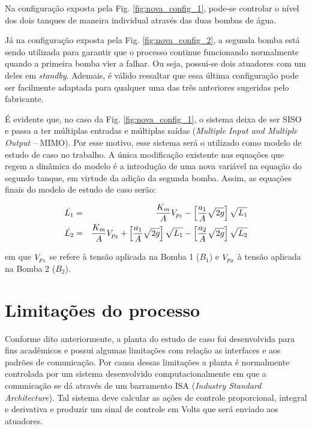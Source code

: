 Na configuração exposta pela Fig. \ref{fig:nova_config_1}, pode-se controlar o
nível dos dois tanques de maneira individual através das duas bombas de água.

Já na configuração exposta pela Fig. \ref{fig:nova_config_2}, a segunda bomba
está sendo utilizada para garantir que o processo continue funcionando
normalmente quando a primeira bomba vier a falhar. Ou seja, possui-se dois
atuadores com um deles em {\it standby}. Ademais, é válido ressaltar que essa
última configuração pode ser facilmente adaptada para qualquer uma das três
anteriores sugeridas pelo fabricante.

É evidente que, no caso da Fig. \ref{fig:nova_config_1}, o sistema deixa de ser
SISO e passa a ter múltiplas entradas e múltiplas saídas ({\it Multiple Input
and Multiple Output} -- MIMO). Por esse motivo, esse sistema será o utilizado
como modelo de estudo de caso no trabalho. A única modificação existente nas
equações que regem a dinâmica do modelo é a introdução de uma nova variável na
equação do segundo tanque, em virtude da adição da segunda bomba. Assim, as
equações finais do modelo de estudo de caso serão:

\begin{eqnarray}
\dot{L_1} & = & \frac{K_m}{A}V_{p_{\tiny 1}} -
                \left[\frac{a_1}{A}\sqrt{2g}\right]\sqrt{L_1}
                \label{eq:l1_ponto}\\
\dot{L_2} & = & \frac{K_m}{A}V_{p_{\tiny 2}} +
                \left[\frac{a_1}{A}\sqrt{2g}\right]\sqrt{L_1} -
                \left[\frac{a_2}{A}\sqrt{2g}\right]\sqrt{L_2}
                \label{eq:l2_ponto}
\end{eqnarray}

\noindent em que $V_{p_{\tiny 1}}$ se refere à tensão aplicada na Bomba 1
($B_1$) e $V_{p_{\tiny 2}}$ à tensão aplicada na Bomba 2 ($B_2$).


\section{Limitações do processo}\label{sec:limitacoes}
Conforme dito anteriormente, a planta do estudo de caso foi desenvolvida para
fins acadêmicos e possui algumas limitações com relação as interfaces e aos
padrões de comunicação. Por causa dessas limitações a planta é normalmente
controlada por um sistema desenvolvido computacionalmente em que a comunicação
se dá através de um barramento ISA ({\it Industry Standard Architecture}). Tal
sistema deve calcular as ações de controle proporcional, integral e derivativa e
produzir um sinal de controle em Volts que será enviado aos atuadores.

